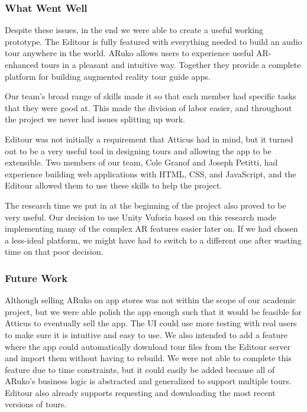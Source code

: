 \documentclass[a4paper, 10pt, american, titlepage]{article}
\begin{document}
\subsubsection{What Went Well}
\label{sec:whatWentWell}

Despite these issues, in the end we were able to create a useful working
prototype. The Editour is fully featured with everything needed to build an
audio tour anywhere in the world. ARuko allows users to experience useful
AR-enhanced tours in a pleasant and intuitive way. Together they provide a
complete platform for building augmented reality tour guide apps.

Our team's broad range of skills made it so that each member had specific tasks
that they were good at. This made the division of labor easier, and throughout
the project we never had issues splitting up work.

Editour was not initially a requirement that Atticus had in mind, but it turned
out to be a very useful tool in designing tours and allowing the app to be
extensible. Two members of our team, Cole Granof and Joseph Petitti, had
experience building web applications with HTML, CSS, and JavaScript, and the
Editour allowed them to use these skills to help the project.

The research time we put in at the beginning of the project also proved to be
very useful. Our decision to use Unity Vuforia based on this research made
implementing many of the complex AR features easier later on. If we had chosen a
less-ideal platform, we might have had to switch to a different one after
wasting time on that poor decision.

\subsubsection{Future Work}
\label{sec:futureWork}

Although selling ARuko on app stores was not within the scope of our academic
project, but we were able polish the app enough such that it would be feasible
for Atticus to eventually sell the app. The UI could use more testing with real
users to make sure it is intuitive and easy to use. We also intended to add a
feature where the app could automatically download tour files from the Editour
server and import them without having to rebuild. We were not able to complete
this feature due to time constraints, but it could easily be added because all
of ARuko's business logic is abstracted and generalized to support multiple
tours. Editour also already supports requesting and downloading the most recent
versions of tours.
\end{document}
